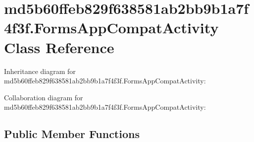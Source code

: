 \hypertarget{classmd5b60ffeb829f638581ab2bb9b1a7f4f3f_1_1_forms_app_compat_activity}{}\section{md5b60ffeb829f638581ab2bb9b1a7f4f3f.\+Forms\+App\+Compat\+Activity Class Reference}
\label{classmd5b60ffeb829f638581ab2bb9b1a7f4f3f_1_1_forms_app_compat_activity}


Inheritance diagram for md5b60ffeb829f638581ab2bb9b1a7f4f3f.\+Forms\+App\+Compat\+Activity\+:


Collaboration diagram for md5b60ffeb829f638581ab2bb9b1a7f4f3f.\+Forms\+App\+Compat\+Activity\+:
\subsection*{Public Member Functions}
